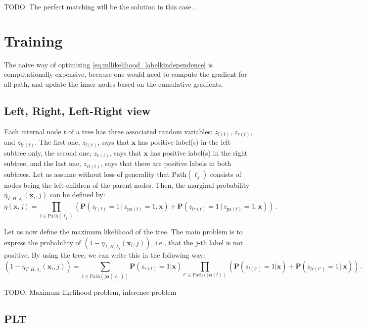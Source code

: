 \documentclass{article}
\newcommand{\Path}[1]{\mathrm{Path}(#1)}
\newcommand{\pa}[1]{\mathrm{pa}(#1)}
\newcommand{\bx}{\mathbf{x}}
\newcommand{\prob}{\mathbf{P}}
\newcommand{\given}{\, | \,}
\newcommand{\Algo}[1]{\textsc{#1}}
\begin{document}
TODO: The perfect matching will be the solution in this case...

\section{Training}

The naive way of optimizing \ref{eq:mllikelihood_labelkindependence} is computationally expensive, because one would need to compute the gradient for all path, and update the inner nodes based on the cumulative gradients. 




\subsection{Left, Right, Left-Right view}

Each internal node $t$ of a tree has three associated random variables: $z_{l(t)}$, $z_{r(t)}$, and $z_{lr(t)}$. The first one, $z_{l(t)}$, says that $\bx$ has positive label(s) in the left subtree only, the second one, $z_{r(t)}$, says that $\bx$ has positive label(s) in the right subtree, and the last one, $z_{rl(t)}$, says that there are positive labels in both subtrees. Let us assume without loss of generality that $\Path{\ell_j}$ consists of nodes being the left children of the parent nodes. Then, the marginal probability $\eta_{T,H,\lambda_i} ( \bx_i , j )$ can be defined by:
\begin{equation}
\eta(\bx, j) = \prod_{t \in \Path{\ell_j}}  \left ( \prob(z_{l(t)} = 1 \given z_{\pa{t}} =1, \bx) + \prob(z_{lr(t)} = 1 \given z_{\pa{t}} =1, \bx) \right ) \,.
\label{eqn:probabilistic_tree}
\end{equation}

Let us now define the maximum likelihood of the tree. The main problem is to express the probability of  $(1-\eta_{T,H,\lambda_i} ( \bx_i , j ))$, i.e., that the $j$-th label is not positive. By using the tree, we can write this in the following way:
\[
(1-\eta_{T,H,\lambda_i} ( \bx_i , j )) = \sum_{t \in \Path{\pa{\ell_j}}}   \prob(z_{r(t)} = 1 | \bx)  \prod_{t' \in \Path{\pa{t}}} \left ( \prob(z_{l(t')} = 1 | \bx) + \prob(z_{lr(t')} = 1 \given \bx) \right )  \,.
\]

TODO: Maximum likelihood problem, inference problem


\subsection{\Algo{PLT}}
\end{document}
